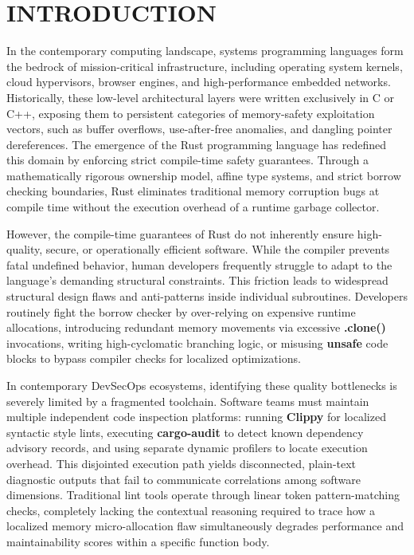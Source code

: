 \patchcmd{\chapter}{\thispagestyle{plain}}{\thispagestyle{fancy}}{}

\chapter{INTRODUCTION}
\patchcmd{\chapter}{\thispagestyle{plain}}{\thispagestyle{fancy}}{}

\hspace{0.5 cm}
In the contemporary computing landscape, systems programming languages form the bedrock of mission-critical infrastructure, including operating system kernels, cloud hypervisors, browser engines, and high-performance embedded networks. Historically, these low-level architectural layers were written exclusively in C or C++, exposing them to persistent categories of memory-safety exploitation vectors, such as buffer overflows, use-after-free anomalies, and dangling pointer dereferences. The emergence of the Rust programming language has redefined this domain by enforcing strict compile-time safety guarantees. Through a mathematically rigorous ownership model, affine type systems, and strict borrow checking boundaries, Rust eliminates traditional memory corruption bugs at compile time without the execution overhead of a runtime garbage collector.
\par However, the compile-time guarantees of Rust do not inherently ensure high-quality, secure, or operationally efficient software. While the compiler prevents fatal undefined behavior, human developers frequently struggle to adapt to the language's demanding structural constraints. This friction leads to widespread structural design flaws and anti-patterns inside individual subroutines. Developers routinely fight the borrow checker by over-relying on expensive runtime allocations, introducing redundant memory movements via excessive \textbf{.clone()} invocations, writing high-cyclomatic branching logic, or misusing \textbf{unsafe} code blocks to bypass compiler checks for localized optimizations.
\newpage
\par In contemporary DevSecOps ecosystems, identifying these quality bottlenecks is severely limited by a fragmented toolchain. Software teams must maintain multiple independent code inspection platforms: running \textbf{Clippy} for localized syntactic style lints, executing \textbf{cargo-audit} to detect known dependency advisory records, and using separate dynamic profilers to locate execution overhead. This disjointed execution path yields disconnected, plain-text diagnostic outputs that fail to communicate correlations among software dimensions. Traditional lint tools operate through linear token pattern-matching checks, completely lacking the contextual reasoning required to trace how a localized memory micro-allocation flaw simultaneously degrades performance and maintainability scores within a specific function body. 

